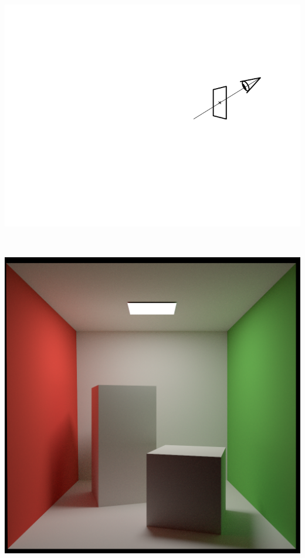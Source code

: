 \documentclass[utf8,stillsansserifmath,fleqn,t]{beamer}
\begin{document}
\begin{frame}
\begin{minipage}{.21\textwidth}
\end{minipage}~~~~
\begin{minipage}{.3\textwidth}
\includegraphics[width=\textwidth]{./fig/antialiasing-1.pdf}
\end{minipage}\\
\begin{minipage}{.25\textwidth}
\includegraphics[width=\textwidth]{./fig/cornellbox-antialiasing-on.png}
\end{minipage}~~~~

\end{frame}
\end{document}
